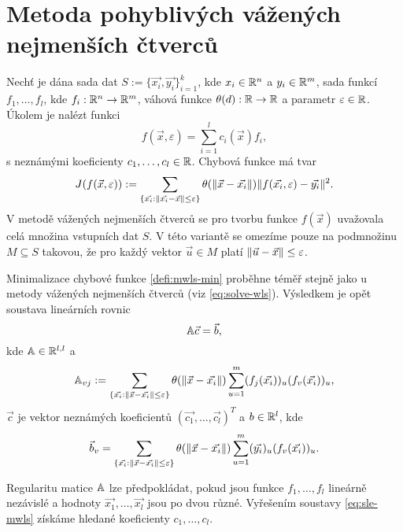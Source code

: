 \section{Metoda pohyblivých vážených nejmenších čtverců}
\label{sec:mwls}

Nechť je dána sada dat $S := \{\vec{x_i}, \vec{y_i}\}_{i = 1}^k$, kde $x_i \in \mathbb{R}^n$ a $y_i \in \mathbb{R}^m$, sada funkcí $f_1,\ldots,f_l$, kde $f_i: \mathbb{R}^n \rightarrow \mathbb{R}^m$, váhová funkce $\theta(d): \mathbb{R} \rightarrow \mathbb{R}$ a parametr $\varepsilon \in \mathbb{R}$. Úkolem je nalézt funkci
\[
  f(\vec{x},\varepsilon) = \sum_{i=1}^lc_i(\vec{x})f_i,
\]
s neznámými koeficienty $c_1, \ldots, c_l \in \mathbb{R}$. Chybová funkce má tvar
\begin{equation}
  \label{defi:mwls-min}
  J(f(\vec{x},\varepsilon)) := \sum_{\{\vec{x_i} : \|\vec{x_i} - \vec{x}\| \leq \varepsilon\}} \theta(\|\vec{x} - \vec{x_i}\|)\|f(\vec{x_i}, \varepsilon) - \vec{y_i}\|^2.
\end{equation}
V metodě vážených nejmenších čtverců se pro tvorbu funkce $f(\vec{x})$ uvažovala celá množina vstupních dat $S$. V této variantě se omezíme pouze na podmnožinu $M \subseteq S$ takovou, že pro každý vektor $\vec{u} \in M$ platí $\|\vec{u} - \vec{x}\| \leq \varepsilon$.

Minimalizace chybové funkce \ref{defi:mwls-min} proběhne téměř stejně jako u metody vážených nejmenších čtverců (viz \ref{eq:solve-wls}). Výsledkem je opět soustava lineárních rovnic
\begin{equation}
  \label{eq:sle-mwls}
  \mathbb{A}\vec{c} = \vec{b},
\end{equation}
kde $\mathbb{A} \in \mathbb{R}^{l,l}$ a
\begin{equation}
  \label{eq:solve-mwls-lhs}
  \mathbb{A}_{vj} := \sum_{\{\vec{x_i}: \|\vec{x} - \vec{x_i}\| \leq \varepsilon\}} \theta(\|\vec{x} - \vec{x_i}\|) \sum_{u = 1}^m (f_j(\vec{x_i}))_u (f_v(\vec{x_i}))_u,
\end{equation}
$\vec{c}$ je vektor neznámých koeficientů $(\vec{c_1}, \ldots, \vec{c_l})^T$ a $b \in \mathbb{R}^l$, kde
\begin{equation}
  \label{eq:solve-mwls-rhs}
  \vec{b}_v = \sum_{\{\vec{x_i}: \|\vec{x} - \vec{x_i}\| \leq \varepsilon \}} \theta(\|\vec{x} - \vec{x_i}\|) \sum_{u=1}^m (\vec{y_i})_u(f_v(\vec{x_i}))_u.
\end{equation}

Regularitu matice $\mathbb{A}$ lze předpokládat, pokud jsou funkce $f_1, \ldots, f_l$ lineárně nezávislé a hodnoty $\vec{x_1}, \ldots, \vec{x_l}$ jsou po dvou různé. Vyřešením soustavy \ref{eq:sle-mwls} získáme hledané koeficienty $c_1, \ldots, c_l$.

